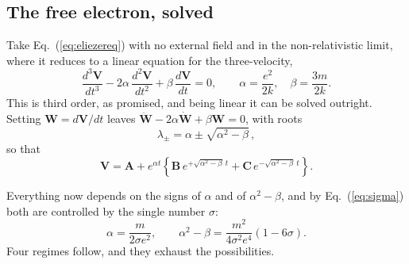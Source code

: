\documentclass[preprint]{aastex701}
\begin{document}
\subsection{The free electron, solved}
\label{sec:eliezerfree}

Take Eq.~(\ref{eq:eliezereq}) with no external field and in the
non-relativistic limit, where it reduces to a linear equation for the
three-velocity,
\begin{equation}
\frac{d^3\mathbf V}{dt^3} - 2\alpha\,\frac{d^2\mathbf V}{dt^2}
+ \beta\,\frac{d\mathbf V}{dt} = 0,
\qquad
\alpha = \frac{e^2}{2k}, \quad \beta = \frac{3m}{2k}.
\label{eq:eliezerfree}
\end{equation}
This is third order, as promised, and being linear it can be solved outright.
Setting $\mathbf W = d\mathbf V/dt$ leaves $\ddot{\mathbf W} - 2\alpha
\dot{\mathbf W} + \beta\mathbf W = 0$, with roots
\begin{equation}
\lambda_\pm = \alpha \pm \sqrt{\alpha^2-\beta}\,,
\label{eq:roots}
\end{equation}
so that
\begin{equation}
\mathbf V = \mathbf A + e^{\alpha t}\left\{
\mathbf B\,e^{+\sqrt{\alpha^2-\beta}\,t}
+ \mathbf C\,e^{-\sqrt{\alpha^2-\beta}\,t}\right\}.
\label{eq:freesolgen}
\end{equation}

Everything now depends on the signs of $\alpha$ and of $\alpha^2-\beta$, and by
Eq.~(\ref{eq:sigma}) both are controlled by the single number $\sigma$:
\begin{equation}
\alpha = \frac{m}{2\sigma e^2},
\qquad
\alpha^2-\beta = \frac{m^2}{4\sigma^2 e^4}\left(1-6\sigma\right).
\label{eq:sigmadeps}
\end{equation}
Four regimes follow, and they exhaust the possibilities.
\end{document}
